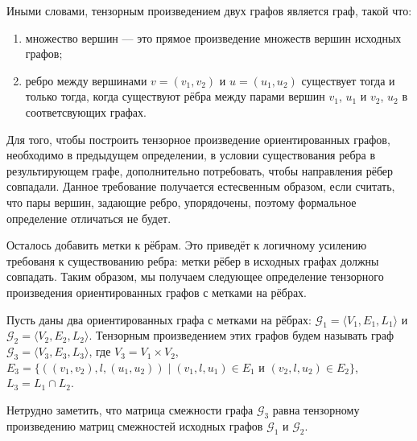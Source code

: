 Иными словами, тензорным произведением двух графов является граф, такой что:
\begin{enumerate}
 \item множество вершин --- это прямое произведение множеств вершин исходных графов;
 \item ребро между вершинами $v=(v_1,v_2)$ и $u=(u_1,u_2)$ существует тогда и только тогда, когда существуют рёбра между парами вершин $v_1$, $u_1$ и $v_2$, $u_2$ в соответсвующих графах. 
\end{enumerate}

Для того, чтобы построить тензорное произведение ориентированных графов, необходимо в предыдущем определении, в условии существования ребра в результирующем графе, дополнительно потребовать, чтобы направления рёбер совпадали.
Данное требование получается естесвенным образом, если считать, что пары вершин, задающие ребро, упорядочены, поэтому формальное определение отличаться не будет.

Осталось добавить метки к рёбрам.
Это приведёт к логичному усилению требованя к существованию ребра: метки рёбер в исходных графах должны совпадать.
Таким образом, мы получаем следующее определение тензорного произведения ориентированных графов с метками на рёбрах.

\begin{definition}
Пусть даны два ориентированных графа с метками на рёбрах: $\mathcal{G}_1 = \langle V_1, E_1, L_1 \rangle$ и $\mathcal{G}_2 = \langle V_2, E_2, L_2 \rangle$.
Тензорным произведением этих графов будем называть граф $\mathcal{G}_3 = \langle V_3, E_3, L_3\rangle$, где $V_3 = V_1 \times V_2$, $E_3 = \{ ((v_1,v_2),l,(u_1,u_2)) \mid (v_1,l,u_1) \in E_1 \text{ и } (v_2,l,u_2) \in E_2 \}$, $L_3=L_1 \cap L_2$.
\end{definition}

Нетрудно заметить, что матрица смежности графа $\mathcal{G}_3$ равна тензорному произведению матриц смежностей исходных графов $\mathcal{G}_1$ и $\mathcal{G}_2$.

